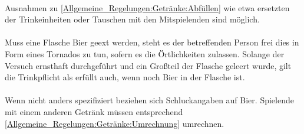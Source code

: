 \paragraph{}
Ausnahmen zu \ref{Allgemeine_Regelungen:Getränke:Abfüllen} wie etwa ersetzten der Trinkeinheiten oder Tauschen mit den Mitspielenden sind möglich.

\paragraph{}
Muss eine Flasche Bier geext werden, steht es der betreffenden Person frei dies in Form eines Tornados zu tun, sofern es die Örtlichkeiten zulassen.
Solange der Versuch ernsthaft durchgeführt und ein Großteil der Flasche geleert wurde, gilt die Trinkpflicht als erfüllt auch, wenn noch Bier in der Flasche ist.

\paragraph{}
Wenn nicht anders spezifiziert beziehen sich Schluckangaben auf Bier.
Spielende mit einem anderen Getränk müssen entsprechend \ref{Allgemeine_Regelungen:Getränke:Umrechnung} umrechnen.
